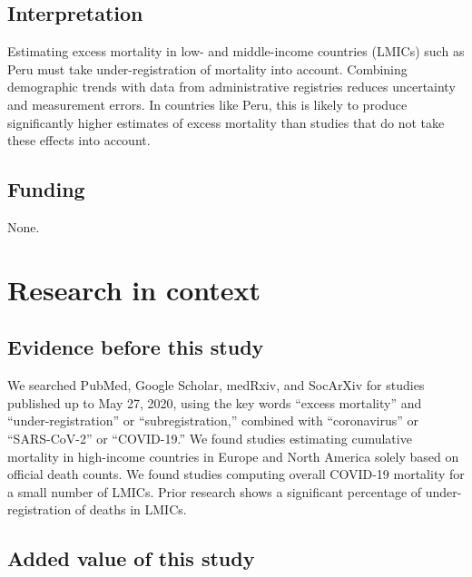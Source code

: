 \documentclass[
]{article}
\begin{document}
\hypertarget{interpretation}{%
\subsection*{Interpretation}\label{interpretation}}

Estimating excess mortality in low- and middle-income countries (LMICs) such as Peru must take under-registration of mortality into account. Combining demographic trends with data from administrative registries reduces uncertainty and measurement errors. In countries like Peru, this is likely to produce significantly higher estimates of excess mortality than studies that do not take these effects into account.

\hypertarget{funding}{%
\subsection*{Funding}\label{funding}}

None.

\hypertarget{research-in-context}{%
\section*{Research in context}\label{research-in-context}}

\hypertarget{evidence-before-this-study}{%
\subsection*{Evidence before this study}\label{evidence-before-this-study}}

We searched PubMed, Google Scholar, medRxiv, and SocArXiv for studies published up to May 27, 2020, using the key words ``excess mortality'' and ``under-registration'' or ``subregistration,'' combined with ``coronavirus'' or ``SARS-CoV-2'' or ``COVID-19.'' We found studies estimating cumulative mortality in high-income countries in Europe and North America solely based on official death counts. We found studies computing overall COVID-19 mortality for a small number of LMICs. Prior research shows a significant percentage of under-registration of deaths in LMICs.

\hypertarget{added-value-of-this-study}{%
\subsection*{Added value of this study}\label{added-value-of-this-study}}
\end{document}
